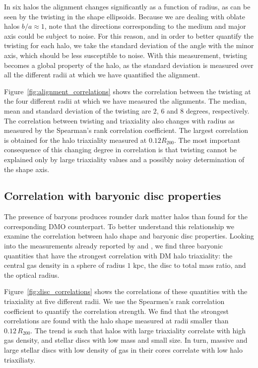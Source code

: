 \documentclass[usenatbib]{mnras}
\begin{document}
In six halos the alignment changes significantly as a function of radius, 
as  can be seen by the twisting in the shape ellipsoids. 
Because we are dealing with oblate halos $b/a\approx 1$, note that the
directions corresponding to the medium and major axis could be subject
to noise. For this reason, and in order to better quantify the twisting for each
halo, we take the standard deviation of the angle with the minor
axis, which should be less susceptible to noise.
With this measurement, twisting becomes a global property of the halo,
as the standard deviation is measured over all the different radii at
which we have quantified the alignment.

Figure~\ref{fig:alignment_correlations} shows the correlation between
the twisting at the four different radii at which we have measured the
alignments. The median, mean and standard deviation of the twisting 
are $2$, $6$ and $8$ degrees, respectively.
The correlation between twisting and triaxiality also changes with
radius as measured by the Spearman's rank correlation coefficient.
The largest correlation is obtained for the halo triaxiality measured at
$0.12R_{200}$. The most important consequence of this changing degree in correlation
is that twisting cannot be explained only by large triaxiality values
and a possibly noisy determination of the shape axis.

\subsection{Correlation with baryonic disc properties}

The presence of baryons produces rounder dark matter halos than found for the 
corresponding DMO \textbf{}counterpart. To better understand this relationship we examine the correlation
between halo shape and baryonic disc properties.  
Looking into the measurements already reported by \cite{auriga} and
\cite{Pakmor17}, we find three baryonic quantities that have the
strongest correlation with DM halo triaxiality: the central gas
density in a sphere of radius $1$ kpc, the disc to total mass ratio, and
the optical radius. 

Figure~\ref{fig:disc_correlations} shows the correlations of
these quantities with the triaxiality at five different radii.
We use the Spearmen's rank correlation coefficient to quantify the
correlation strength. We find that the strongest correlations are found with the halo shape
measured at radii smaller than $0.12\, R_{200}$.
The  trend is such that halos with large triaxiality correlate with
high gas density, and stellar discs with low mass and small size. 
In turn, massive and large stellar discs with low density of
gas in their cores correlate with low halo triaxiliaty. 
\end{document}
